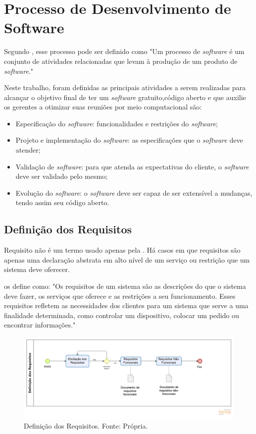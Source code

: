 \section{Processo de Desenvolvimento de Software}
\label{sec:processo_de_desenvolvimento_de_software}

Segundo , esse processo pode ser definido como "Um processo de \textit{software} é um conjunto de atividades relacionadas que levam à produção de um produto de \textit{software}."

Neste trabalho, foram definidas as principais atividades a serem realizadas para alcançar o objetivo final de ter um \textit{software} gratuito,código aberto e que auxilie os gerentes a otimizar suas reuniões por meio computacional são:

\begin{itemize}
    \item Especificação do \textit{software}: funcionalidades e restrições do \textit{software};
    \item Projeto e implementação do \textit{software}: as especificações que o \textit{software} deve atender;
    \item Validação de \textit{software}: para que atenda as expectativas do cliente, o \textit{software} deve ser validado pelo mesmo;
    \item Evolução do \textit{software}: o \textit{software} deve ser capaz de ser extensível a mudanças, tendo assim seu código aberto.
\end{itemize}

\subsection{Definição dos Requisitos}

Requisito não é um termo usado apenas pela \imprimircurso. Há casos em que requisitos são apenas uma declaração abstrata em alto nível de um serviço ou restrição que um sistema deve oferecer.

 os define como: "Os requisitos de um sistema são as descrições do que o sistema deve fazer, os serviços que oferece e as restrições a seu funcionamento. Esses requisitos refletem as necessidades dos clientes para um sistema que serve a uma finalidade determinada, como controlar um dispositivo, colocar um pedido ou encontrar informações."

\begin{figure}[H]
	\centering
	\includegraphics[width=1.0\textwidth]{figuras/elicitacaoDosRequisitos.png}
	\caption{Definição dos Requisitos. Fonte: Própria.}
	\label{img:definicao_requisitos}
\end{figure}

